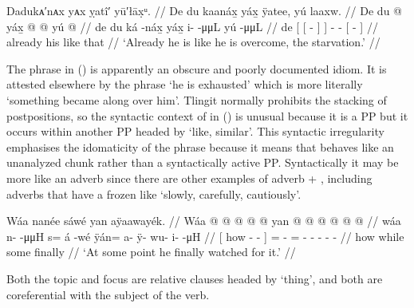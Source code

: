 \ex\label{ex:90-20-starvation}%
%
\begingl
	\glpreamble	Dadukᴀ′nᴀx yᴀx ỵatî′ yū′łāx̣ᵘ. //
	\glpreamble	De du kaanáx̱ yáx̱ ÿatee, yú laaxw. //
	\gla	De {} {} du  @ {} {} yáx̱ {}
		 @ {} @ {}
		{} yú  @ {} {} //
	\glb	de {} {} du ká -náx̱ {} yáx̱ {}
		i-  -μμL
		{} yú  -μμL {} //
	\glc	de {}[\pr{PP} {}[   - {}]  {}]
		-  -
		{}[   - {}] //
	\gld	already {} {} his  {} {} like {}
		 {} {}
		{} that  {} {} //
	\glft	‘Already he is like he is overcome, the starvation.’
		//
\endgl
\xe

The phrase  in (\lastx) is apparently an obscure and poorly documented idiom.
It is attested elsewhere by the phrase  ‘he is exhausted’ \parencite[f06/2]{leer:1973} which is more literally ‘something became along over him’.
Tlingit normally prohibits the stacking of postpositions, so the syntactic context of  in (\lastx) is unusual because it is a PP but it occurs within another PP headed by  ‘like, similar’.
This syntactic irregularity emphasises the idomaticity of the phrase because it means that  behaves like an unanalyzed chunk rather than a syntactically active PP.
Syntactically it may be more like an adverb since there are other examples of adverb + , including adverbs that have a frozen  like  ‘slowly, carefully, cautiously’.

\ex\label{ex:90-21-watch-for}%
%
\begingl
	\glpreamble	Wáa nanée sáwé yan aÿaawayék. //
	\gla	{} Wáa  @ {} @ {} @ {} {}
		 @ {} @ {}
		yan @  @ {} @ {} @ {} @ {} @ {} //
	\glb	{} wáa n-  -μμH {} {} 
		s= á -wé
		ÿán= a- ÿ- wu- i-  -μH //
	\glc	{}[ how -  - \· {}]
		=  -
		= - - - -  - //
	\gld	{} how  {} {} \·while {}
		some\·  {}
		finally\·  {} {} {} {} {}  //
	\glft	‘At some point he finally watched for it.’
		//
\endgl
\xe

Both the topic and focus are relative clauses headed by  ‘thing’, and both are coreferential with the subject of the verb.

